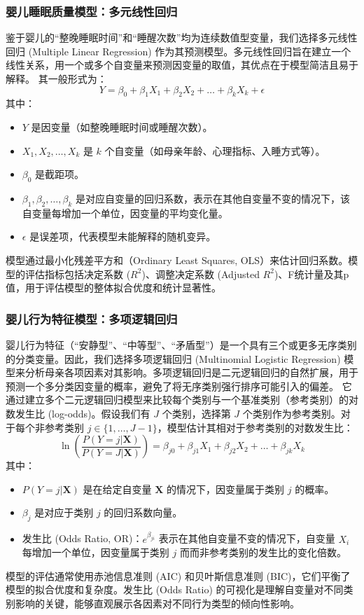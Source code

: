 \documentclass[withoutpreface,bwprint]{cumcmthesis}
\begin{document}
\subsubsection{婴儿睡眠质量模型：多元线性回归}
鉴于婴儿的“整晚睡眠时间”和“睡醒次数”均为连续数值型变量，我们选择多元线性回归 (Multiple Linear Regression) 作为其预测模型。多元线性回归旨在建立一个线性关系，用一个或多个自变量来预测因变量的取值，其优点在于模型简洁且易于解释。
其一般形式为：
$$ Y = \beta_0 + \beta_1 X_1 + \beta_2 X_2 + \dots + \beta_k X_k + \epsilon $$
其中：
\begin{itemize}
    \item $Y$ 是因变量（如整晚睡眠时间或睡醒次数）。
    \item $X_1, X_2, \dots, X_k$ 是 $k$ 个自变量（如母亲年龄、心理指标、入睡方式等）。
    \item $\beta_0$ 是截距项。
    \item $\beta_1, \beta_2, \dots, \beta_k$ 是对应自变量的回归系数，表示在其他自变量不变的情况下，该自变量每增加一个单位，因变量的平均变化量。
    \item $\epsilon$ 是误差项，代表模型未能解释的随机变异。
\end{itemize}
模型通过最小化残差平方和（Ordinary Least Squares, OLS）来估计回归系数。模型的评估指标包括决定系数 ($R^2$)、调整决定系数 (Adjusted $R^2$)、F统计量及其p值，用于评估模型的整体拟合优度和统计显著性。

\subsubsection{婴儿行为特征模型：多项逻辑回归}
婴儿行为特征（“安静型”、“中等型”、“矛盾型”）是一个具有三个或更多无序类别的分类变量。因此，我们选择多项逻辑回归 (Multinomial Logistic Regression) 模型来分析母亲各项因素对其影响。多项逻辑回归是二元逻辑回归的自然扩展，用于预测一个多分类因变量的概率，避免了将无序类别强行排序可能引入的偏差。
它通过建立多个二元逻辑回归模型来比较每个类别与一个基准类别（参考类别）的对数发生比 (log-odds)。假设我们有 $J$ 个类别，选择第 $J$ 个类别作为参考类别。对于每个非参考类别 $j \in \{1, \dots, J-1\}$，模型估计其相对于参考类别的对数发生比：
$$ \ln\left(\frac{P(Y=j | \mathbf{X})}{P(Y=J | \mathbf{X})}\right) = \beta_{j0} + \beta_{j1} X_1 + \beta_{j2} X_2 + \dots + \beta_{jk} X_k $$
其中：
\begin{itemize}
    \item $P(Y=j | \mathbf{X})$ 是在给定自变量 $\mathbf{X}$ 的情况下，因变量属于类别 $j$ 的概率。
    \item $\beta_{j}$ 是对应于类别 $j$ 的回归系数向量。
\item 发生比 (Odds Ratio, OR)：$e^{\beta_{ji}}$ 表示在其他自变量不变的情况下，自变量 $X_i$ 每增加一个单位，因变量属于类别 $j$ 而而非参考类别的发生比的变化倍数。
\end{itemize}
模型的评估通常使用赤池信息准则 (AIC) 和贝叶斯信息准则 (BIC)，它们平衡了模型的拟合优度和复杂度。发生比 (Odds Ratio) 的可视化是理解自变量对不同类别影响的关键，能够直观展示各因素对不同行为类型的倾向性影响。
\end{document}
